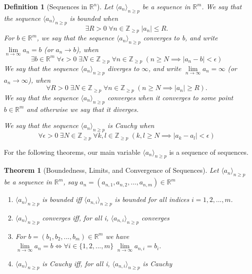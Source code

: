 \documentclass[11pt, oneside]{book}
\theoremstyle{break}
\newtheorem{thm}{Theorem}[section]
\newtheorem{defn}{Definition}[section]
\newcommand{\bb}[1]{\mathbb{#1}}			%
\begin{document}
\begin{defn}[Sequences in $\bb{R}^n$]
	Let $\langle a_n \rangle_{n \geq p}$ be a sequence in $\bb{R}^m$. We say that the sequence $\langle a_n \rangle_{n \geq p}$ is bounded when
	\begin{equation*}
		\exists R > 0 \; \forall n \in \bb{Z}_{\geq p} \; |a_n| \leq R.
	\end{equation*}
	For $b \in \bb{R}^m$, we say that the sequence $\langle a_n \rangle_{n \geq p}$ converges to b, and write $\lim\limits_{n \to \infty} a_n = b$ (or $a_n \to b$), when
	\begin{equation*}
		\exists b \in \bb{R}^m \; \forall \epsilon > 0 \; \exists N \in \bb{Z}_{\geq p} \; \forall n \in \bb{Z}_{\geq p} \; (n \geq N \implies |a_n - b| < \epsilon)
	\end{equation*}
	We say that the sequence $\langle a_n \rangle_{n \geq p}$ diverges to $\infty$, and write $\lim\limits_{n \to \infty} a_n = \infty$ (or $a_n \to \infty$), when
	\begin{equation*}
		\forall R > 0 \; \exists N \in \bb{Z}_{\geq p} \; \forall n \in \bb{Z}_{\geq p} \; (n \geq N \implies |a_n| \geq R).
	\end{equation*}
	We say that the sequence $\langle a_n \rangle_{n \geq p}$ converges when it converges to some point $b \in \bb{R}^m$ and otherwise we say that it diverges.

	We say that the sequence $\langle a_n \rangle_{n \geq p}$ is Cauchy when
	\begin{equation*}
		\forall \epsilon > 0 \; \exists N \in \bb{Z}_{\geq p} \; \forall k, l \in \bb{Z}_{\geq p} \; (k, l \geq N \implies |a_k - a_l| < \epsilon)
	\end{equation*}
\end{defn}

For the following theorems, our main variable $\langle a_n \rangle_{n \geq p}$ is a sequence of sequences.

\begin{thm}[Boundedness, Limits, and Convergence of Sequences]
	Let $\langle a_n \rangle_{n \geq p}$ be a sequence in $\bb{R}^m$, say $a_n = (a_{n ,1}, a_{n, 2}, ..., a_{n, m}) \in \bb{R}^m$
	\begin{enumerate}
		\item $\langle a_n \rangle_{n \geq p}$ is bounded iff $\langle a_{n, i} \rangle_{n \geq p}$ is bounded for all indices $i = 1, 2, ..., m$.
		\item $\langle a_n \rangle_{n \geq p}$ converges iff, for all i, $\langle a_{n, i} \rangle_{n \geq p}$ converges
		\item For $b = (b_1, b_2, ..., b_m) \in \bb{R}^m$ we have $\lim\limits_{n \to \infty} a_n = b \iff \forall i \in \{1, 2, ..., m\} \; \lim\limits_{n \to \infty} a_{n, i} = b_i$.
		\item $\langle a_n \rangle_{n \geq p}$ is Cauchy iff, for all i, $\langle a_{n, i} \rangle_{n \geq p}$ is Cauchy
	\end{enumerate}
\end{thm}
\end{document}
